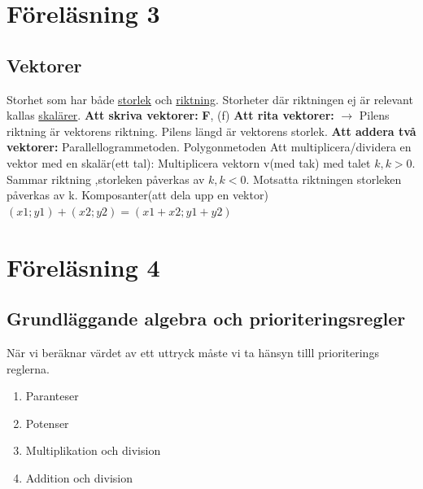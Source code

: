 \documentclass[a4paper,11pt]{article}
\begin{document}
\begin{flushleft}
\section{Föreläsning 3}
\subsection{Vektorer}
Storhet som har både \underline{storlek} och \underline{riktning}.\newline
Storheter där riktningen ej är relevant kallas \underline{skalärer}.\newline
\textbf{Att skriva vektorer:}\newline
\textbf{F}, (f)\newline
\textbf{Att rita vektorer:}\newline
$ \longrightarrow $\newline
Pilens riktning är vektorens riktning.\newline
Pilens längd är vektorens storlek.\newline
\textbf{Att addera två vektorer:}\newline
Parallellogrammetoden.\newline
Polygonmetoden\newline
Att multiplicera/dividera en vektor med en skalär(ett tal):\newline
Multiplicera vektorn v(med tak) med talet $ k, k>0 $.\newline
Sammar riktning ,storleken påverkas av $ k, k<0 $.\newline
Motsatta riktningen storleken påverkas av k.\newline
Komposanter(att dela upp en vektor)
$ (x1;y1)+(x2;y2) = (x1+x2;y1+y2) $
\newpage
\section{Föreläsning 4}
\subsection{Grundläggande algebra och prioriteringsregler}
När vi beräknar värdet av ett uttryck måste vi ta hänsyn tilll prioriterings reglerna.
\begin{enumerate}
  \item Paranteser
  \item Potenser
  \item Multiplikation och division
  \item Addition och division 
\end{enumerate}

\end{flushleft}
\end{document}
